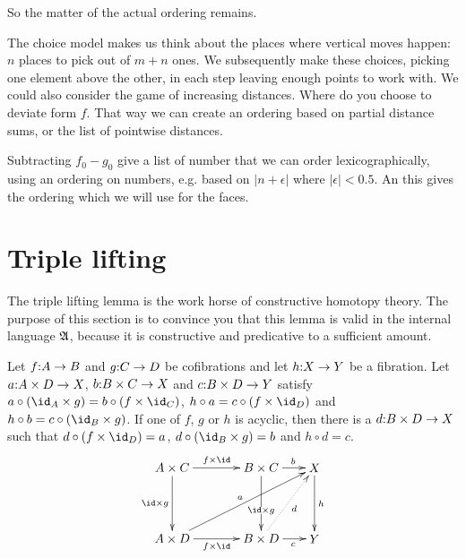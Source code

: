 \documentclass[csh.tex]{subfiles}
\begin{document}
So the matter of the actual ordering remains.

The choice model makes us think about the places where vertical moves happen: $n$ places to pick out of $m+n$ ones.
We subsequently make these choices, picking one element above the other, in each step leaving enough points to work with.
We could also consider the game of increasing distances. Where do you choose to deviate form $f$.
That way we can create an ordering based on partial distance sums, or the list of pointwise distances.

Subtracting $f_0-g_0$ give a list of number that we can order lexicographically, using an ordering on numbers, e.g. based on $|n+\epsilon|$ where $|\epsilon|<0.5$.
An this gives the ordering which we will use for the faces.


\section{Triple lifting}
The triple lifting lemma is the work horse of constructive homotopy theory. The purpose of this section is to convince you that this lemma is valid in the internal language $\mathfrak A$, because it is constructive and predicative to a sufficient amount.

\begin{lemma} Let $f\mathord : A\to B$ and $g\mathord : C\to D$ be cofibrations and let $h\mathord : X\to Y$ be a fibration. Let $a\mathord : A\times D\to X$, $b\mathord : B\times C\to X$ and $c\mathord : B \times D\to Y$ satisfy $a\circ(\id_A\times g) = b\circ(f\times \id_C)$, $h\circ a=c\circ(f\times \id_D)$ and $h\circ b=c\circ(\id_B\times g)$. If one of $f$, $g$ or $h$ is acyclic, then there is a $d\mathord : B\times D\to X$ such that $d\circ(f\times\id_D)=a$, $d\circ(\id_B\times g)=b$ and $h\circ d = c$.
\[\xy
(0,20)*+{A\times C}="AC",(25,20)*+{B\times C}="BC",(40,20)*+{X}="X",
(0,0)*+{A\times D}="AD",(25,0)*+{B\times D}="BD",(40,0)*+{Y}="Y"
\ar^{f\times\id} "AC";"BC"
\ar_{\id\times g} "AC";"AD"
\ar_{f\times\id} "AD";"BD"
\ar^{a} "AD";"X"
\ar|(.6){\id\times g} "BC";"BD"
\ar^(.6){b} "BC";"X"
\ar@{.>}_{d} "BD";"X"
\ar_(.6){c} "BD";"Y"
\ar^{h} "X";"Y"
\endxy\]
\label{triple lift}
\end{lemma}
\end{document}
